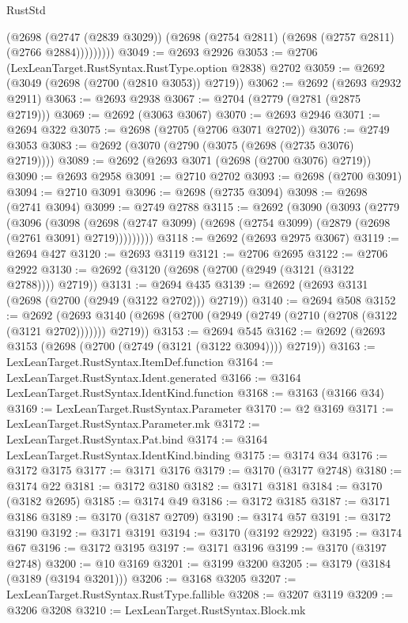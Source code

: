 \begin{lexlean}{RustStd}
\begin{coremodule}
{\begin{coremodule}
{{{{{{{{{{{{{{{{{{{{{{{{{{              (@2698
                (@2747 (@2839 @3029))
                (@2698 (@2754 @2811) (@2698 (@2757 @2811) (@2766 @2884)))))))))
@3049 := @2693 @2926
@3053 := @2706 (LexLeanTarget.RustSyntax.RustType.option @2838) @2702
@3059 := @2692 (@3049 (@2698 (@2700 (@2810 @3053)) @2719))
@3062 := @2692 (@2693 @2932 @2911)
@3063 := @2693 @2938
@3067 := @2704 (@2779 (@2781 (@2875 @2719)))
@3069 := @2692 (@3063 @3067)
@3070 := @2693 @2946
@3071 := @2694 @322
@3075 := @2698 (@2705 (@2706 @3071 @2702))
@3076 := @2749 @3053
@3083 := @2692 (@3070 (@2790 (@3075 (@2698 (@2735 @3076) @2719))))
@3089 := @2692 (@2693 @3071 (@2698 (@2700 @3076) @2719))
@3090 := @2693 @2958
@3091 := @2710 @2702
@3093 := @2698 (@2700 @3091)
@3094 := @2710 @3091
@3096 := @2698 (@2735 @3094)
@3098 := @2698 (@2741 @3094)
@3099 := @2749 @2788
@3115 := @2692
    (@3090
      (@3093
        (@2779
          (@3096
            (@3098
              (@2698 (@2747 @3099) (@2698 (@2754 @3099) (@2879 (@2698 (@2761 @3091) @2719)))))))))
@3118 := @2692 (@2693 @2975 @3067)
@3119 := @2694 @427
@3120 := @2693 @3119
@3121 := @2706 @2695
@3122 := @2706 @2922
@3130 := @2692 (@3120 (@2698 (@2700 (@2949 (@3121 (@3122 @2788)))) @2719))
@3131 := @2694 @435
@3139 := @2692 (@2693 @3131 (@2698 (@2700 (@2949 (@3122 @2702))) @2719))
@3140 := @2694 @508
@3152 := @2692
    (@2693 @3140 (@2698 (@2700 (@2949 (@2749 (@2710 (@2708 (@3122 (@3121 @2702))))))) @2719))
@3153 := @2694 @545
@3162 := @2692 (@2693 @3153 (@2698 (@2700 (@2749 (@3121 (@3122 @3094)))) @2719))
@3163 := LexLeanTarget.RustSyntax.ItemDef.function
@3164 := LexLeanTarget.RustSyntax.Ident.generated
@3166 := @3164 LexLeanTarget.RustSyntax.IdentKind.function
@3168 := @3163 (@3166 @34)
@3169 := LexLeanTarget.RustSyntax.Parameter
@3170 := @2 @3169
@3171 := LexLeanTarget.RustSyntax.Parameter.mk
@3172 := LexLeanTarget.RustSyntax.Pat.bind
@3174 := @3164 LexLeanTarget.RustSyntax.IdentKind.binding
@3175 := @3174 @34
@3176 := @3172 @3175
@3177 := @3171 @3176
@3179 := @3170 (@3177 @2748)
@3180 := @3174 @22
@3181 := @3172 @3180
@3182 := @3171 @3181
@3184 := @3170 (@3182 @2695)
@3185 := @3174 @49
@3186 := @3172 @3185
@3187 := @3171 @3186
@3189 := @3170 (@3187 @2709)
@3190 := @3174 @57
@3191 := @3172 @3190
@3192 := @3171 @3191
@3194 := @3170 (@3192 @2922)
@3195 := @3174 @67
@3196 := @3172 @3195
@3197 := @3171 @3196
@3199 := @3170 (@3197 @2748)
@3200 := @10 @3169
@3201 := @3199 @3200
@3205 := @3179 (@3184 (@3189 (@3194 @3201)))
@3206 := @3168 @3205
@3207 := LexLeanTarget.RustSyntax.RustType.fallible
@3208 := @3207 @3119
@3209 := @3206 @3208
@3210 := LexLeanTarget.RustSyntax.Block.mk
}}}}}}}}}}}}}}}}}}}}}}}}}}
\end{coremodule}}
\end{coremodule}
\end{lexlean}
